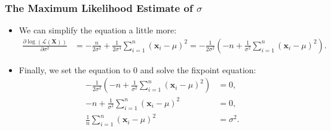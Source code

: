 \begin{frame}
	\frametitle{The Maximum Likelihood Estimate of $\sigma$}
	\begin{itemize}
		\item We can simplify the equation a little more:
		      \begin{align}
			      \frac{\partial \log\left(\mathcal{L}(\mathbf{X})\right)}{\partial \sigma^2} & = -\frac{n}{2\sigma^2} + \frac{1}{2\sigma^4} \sum_{i=1}^{n} (\mathbf{x}_i-\mu)^2 = -\frac{1}{2\sigma^2} \left( -n + \frac{1}{\sigma^2} \sum_{i=1}^{n} (\mathbf{x}_i-\mu)^2\right).
		      \end{align}
		\item Finally, we set the equation to $0$ and solve the fixpoint equation:
		      \begin{align}
			      -\frac{1}{2\sigma^2} \left( -n + \frac{1}{\sigma^2} \sum_{i=1}^{n} (\mathbf{x}_i-\mu)^2\right) & = 0,        \\
			      -n + \frac{1}{\sigma^2} \sum_{i=1}^{n} (\mathbf{x}_i-\mu)^2                                    & = 0,        \\
			      \frac{1}{n} \sum_{i=1}^{n} (\mathbf{x}_i-\mu)^2                                                & = \sigma^2.
		      \end{align}
	\end{itemize}
\end{frame}


